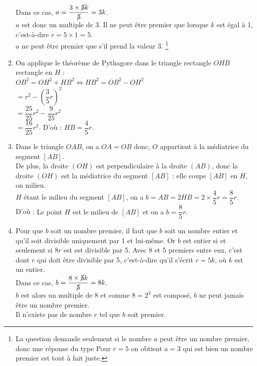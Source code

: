 \begin{corrige}
\begin{enumerate}
         Dans ce cas, $a = \dfrac{3\times\cancel{5}k}{\cancel{5}} =3k$. \\ [1mm]
         $a$ est donc un multiple de $3$. Il ne peut être premier que lorsque $k$ est égal à 1, c'est-à-dire $r = 5\times1 =5$. \\
         {\blue $a$ ne peut être premier que s'il prend la valeur 3}. \footnote{La question demande seulement si le nombre $a$ peut être un nombre premier, donc une réponse du type \og Pour $r =5$ on obtient $a =3$ qui est bien un nombre premier \fg{} est tout à fait juste.}
      \item On applique le théorème de Pythagore dans le triangle rectangle $OHB$ rectangle en $H$ : \\
         $OB^2 = OH^2+ HB^2 \iff HB^2 = OB^2-OH^2$ \\
         \hspace*{4.4cm} $=r^2-\left(\dfrac35r\right)^2$ \\ [1mm]
         \hspace*{4.4cm} $= \dfrac{25}{25}r^2-\dfrac{9}{25}r^2$ \\ [1mm]
         \hspace*{4.4cm} $= \dfrac{16}{25} r^2$. \qquad D'où : {\blue $HB =\dfrac45r$.}
         \smallskip
      \item Dans le triangle $OAB$, on a $OA = OB$ donc, $O$ appartient à la médiatrice du segment $[AB]$. \\
         De plus, la droite $(OH)$ est perpendiculaire à la droite $(AB)$, donc la droite $(OH)$ est la médiatrice du segment $[AB]$ : elle coupe $[AB]$ en $H$, on milieu. \\
         $H$ étant le milieu du segment $[AB]$, on a $b =AB = 2HB =2\times\dfrac45r =\dfrac{8}{5}r$. \\
         D'où : {\blue Le point $H$ est le milieu de $[AB]$ et on a $b =\dfrac{8}{5}r$.}
         \smallskip
      \item Pour que $b$ soit un nombre premier, il faut que $b$ soit un nombre entier et qu'il soit divisible uniquement par 1 et lui-même. Or $b$ est entier si et seulement si $8r$ est est divisible par 5. Avec 8 et 5 premiers entre eux, c'est dont $r$ qui doit être divisible par 5, c'est-à-dire qu'il s'écrit $r = 5k$, où $k$ est un entier. \\
         Dans ce cas, $b =\dfrac{8\times\cancel{5}k}{\cancel{5}} =8k$. \\
         $b$ est alors un multiple de 8 et comme $8 =2^3$ est composé, $b$ ne peut jamais être un nombre premier. \\
         {\blue Il n'existe pas de nombre $r$ tel que $b$ soit premier.}
   \end{enumerate}
\end{corrige}

